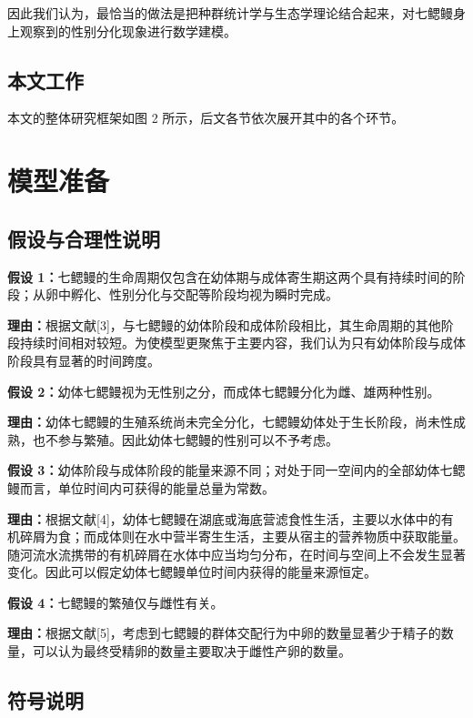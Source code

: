 \documentclass[11pt,a4paper]{ctexart}
\begin{document}
因此我们认为，最恰当的做法是把种群统计学与生态学理论结合起来，对七鳃鳗身上观察到的性别分化现象进行数学建模。

\subsection{本文工作}

本文的整体研究框架如图 2 所示，后文各节依次展开其中的各个环节。

\section{模型准备}

\subsection{假设与合理性说明}

\noindent\textbf{假设 1：}七鳃鳗的生命周期仅包含在幼体期与成体寄生期这两个具有持续时间的阶段；从卵中孵化、性别分化与交配等阶段均视为瞬时完成。

\noindent\textbf{理由：}根据文献[3]，与七鳃鳗的幼体阶段和成体阶段相比，其生命周期的其他阶段持续时间相对较短。为使模型更聚焦于主要内容，我们认为只有幼体阶段与成体阶段具有显著的时间跨度。

\noindent\textbf{假设 2：}幼体七鳃鳗视为无性别之分，而成体七鳃鳗分化为雌、雄两种性别。

\noindent\textbf{理由：}幼体七鳃鳗的生殖系统尚未完全分化，七鳃鳗幼体处于生长阶段，尚未性成熟，也不参与繁殖。因此幼体七鳃鳗的性别可以不予考虑。

\noindent\textbf{假设 3：}幼体阶段与成体阶段的能量来源不同；对处于同一空间内的全部幼体七鳃鳗而言，单位时间内可获得的能量总量为常数。

\noindent\textbf{理由：}根据文献[4]，幼体七鳃鳗在湖底或海底营滤食性生活，主要以水体中的有机碎屑为食；而成体则在水中营半寄生生活，主要从宿主的营养物质中获取能量。随河流水流携带的有机碎屑在水体中应当均匀分布，在时间与空间上不会发生显著变化。因此可以假定幼体七鳃鳗单位时间内获得的能量来源恒定。

\noindent\textbf{假设 4：}七鳃鳗的繁殖仅与雌性有关。

\noindent\textbf{理由：}根据文献[5]，考虑到七鳃鳗的群体交配行为中卵的数量显著少于精子的数量，可以认为最终受精卵的数量主要取决于雌性产卵的数量。

\subsection{符号说明}
\end{document}
